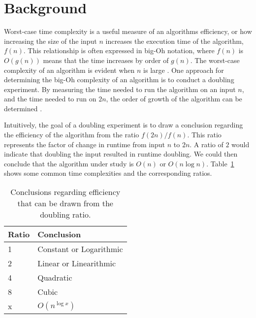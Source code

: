 \section{Background}

Worst-case time complexity is a useful measure of an algorithms
efficiency, or how increasing the size
of the input $n$ increases the execution time of the algorithm, $f(n)$.
This relationship is often expressed in big-Oh notation, where $f(n)$
is $O(g(n))$ means that the time increases by order of $g(n)$. The
worst-case complexity of an algorithm is evident when $n$ is large 
\cite{Goodrich:Data}. One approach for determining the big-Oh complexity
of an algorithm is to conduct a doubling experiment. By measuring the
time needed to run the algorithm on an input $n$, and the time needed to
run on $2n$, the order of growth of the algorithm can be determined \cite{Mcgeoch:Algorithmics,Sedgewick:Analysis}. 

Intuitively, the goal of a doubling experiment is to draw a conclusion
regarding the efficiency of the algorithm from the ratio
$f(2n)/f(n)$. This ratio represents the factor of change in runtime from
input $n$ to $2n$. A ratio of $2$ would indicate that doubling the
input resulted in runtime doubling. We could then conclude that the
algorithm under study is $O(n)$ or $O(n\log n)$.
Table~\ref{table:ratios} shows some common time complexities and the
corresponding ratios.

\begin{table}[h]
\begin{tabular}{l|l}
Ratio & Conclusion              \\ \hline
1     & Constant or Logarithmic \\
2     & Linear or Linearithmic  \\
4     & Quadratic               \\
8     & Cubic                   \\
x     & $O(n^{\log x})$          
\end{tabular}
\label{table:ratios}
\caption{Conclusions regarding efficiency that can be drawn from the
doubling ratio.}
\end{table}
